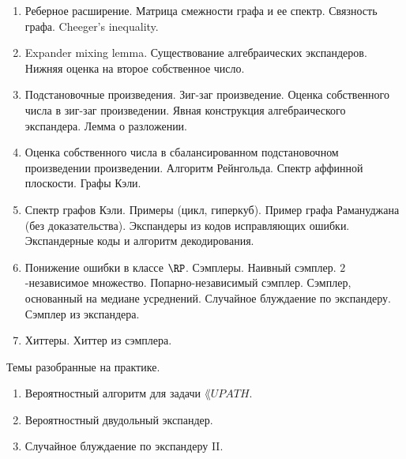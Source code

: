 \begin{enumerate}
    \item Реберное расширение. Матрица смежности графа и ее спектр. Связность графа. Cheeger's inequality.
    \item Expander mixing lemma. Существование алгебраических экспандеров. Нижняя оценка на второе собственное число.
    \item Подстановочные произведения. Зиг-заг произведение. Оценка собственного числа в зиг-заг произведении. Явная
        конструкция алгебраического экспандера. Лемма о разложении. 
    \item Оценка собственного числа в сбалансированном подстановочном произведении произведении. Алгоритм Рейнгольда. Спектр
        аффинной плоскости. Графы Кэли.
    \item Спектр графов Кэли. Примеры (цикл, гиперкуб). Пример графа Рамануджана (без доказательства). Экспандеры из кодов
        исправляющих ошибки. Экспандерные коды и алгоритм декодирования.
    \item Понижение ошибки в классе $\RP$. Сэмплеры. Наивный сэмплер. $2$-независимое множество. Попарно-независимый
        сэмплер. Сэмплер, основанный на медиане усреднений. Случайное блуждаение по экспандеру. Сэмплер из экспандера.
    \item Хиттеры. Хиттер из сэмплера.
\end{enumerate}

\breakline

Темы разобранные на практике.
\begin{enumerate}
    \item Вероятностный алгоритм для задачи $\lang{UPATH}$.
    \item Вероятностный двудольный экспандер.
    \item Случайное блуждаение по экспандеру II.
\end{enumerate}